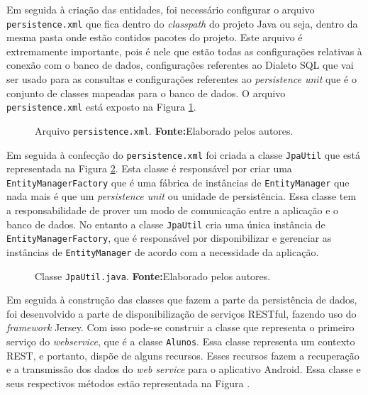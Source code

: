 	\par Em seguida à criação das entidades, foi necessário configurar o arquivo
\texttt{persistence.xml} que fica dentro do \textit{classpath} do projeto
Java ou seja, dentro da mesma pasta onde estão contidos pacotes do
projeto. Este arquivo é extremamente importante, pois é nele que estão todas
as configurações relativas à conexão com o banco de dados, configurações
referentes ao Dialeto SQL que vai ser usado para as consultas e configurações
referentes ao \textit{persistence unit} que é o conjunto de classes mapeadas
para o banco de dados.	O arquivo \texttt{persistence.xml} está exposto na
Figura \ref{fig:qm11}.

	\begin{figure}[h!]
		
		\caption[Arquivo \texttt{persistence.xml}]{Arquivo \texttt{persistence.xml}.
		\textbf{Fonte:}Elaborado pelos autores.}
		\label{fig:qm11}
	\end{figure}
	
	\par Em seguida à confecção do \texttt{persistence.xml} foi criada a
classe \texttt{JpaUtil} que está representada na Figura \ref{fig:qm12}.
Esta classe é responsável por criar uma \texttt{EntityManagerFactory} que é
uma  fábrica de instâncias de \texttt{EntityManager} que nada mais é que um
\textit{persistence unit} ou unidade de persistência. Essa classe tem a
responsabilidade de prover um modo de comunicação entre a aplicação e o banco
de dados. No entanto a classe \texttt{JpaUtil} cria uma única instância de
\texttt{EntityManagerFactory}, que é responsável por disponibilizar e
gerenciar as instâncias de \texttt{EntityManager} de acordo com a necessidade
da aplicação.
	
	\pagebreak
	\begin{figure}[h!]
		
		\caption[Classe \texttt{JpaUtil.java}]{Classe \texttt{JpaUtil.java}.
		\textbf{Fonte:}Elaborado pelos autores.}
		\label{fig:qm12}
	\end{figure}
		
	\par Em seguida à construção das classes que fazem a parte da persistência de
dados, foi desenvolvido a parte de disponibilização de serviços
RESTful, fazendo uso do \textit{framework} Jersey. Com isso
pode-se construir a classe que representa o primeiro serviço do
\textit{webservice}, que é a classe \texttt{Alunos}. Essa classe representa um
contexto REST, e portanto, dispõe de alguns recursos. Esses recursos fazem a
recuperação e a transmissão dos dados do \textit{web service} para o aplicativo
Android. Essa classe e seus respectivos métodos  estão representada na
Figura .
		
